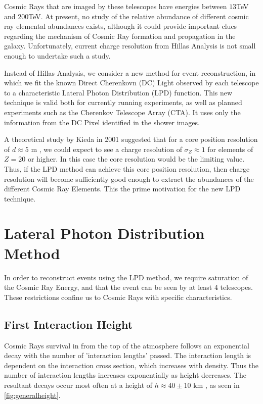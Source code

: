 \documentclass{article}
\begin{document}
Cosmic Rays that are imaged by these telescopes have energies between $13 $TeV and $200 $TeV. At present, no study of the relative abundance of different cosmic ray elemental abundances exists, although it could provide important clues regarding the mechanism of Cosmic Ray formation and propagation in the galaxy. Unfortunately, current charge resolution from Hillas Analysis is not small enough to undertake such a study.

Instead of Hillas Analysis, we consider a new method for event reconstruction, in which we fit the known Direct Cherenkovn (DC) Light observed by each telescope to a characteristic Lateral Photon Distribution (LPD) function. This new technique is valid both for currently running experiments, as well as planned experiments such as the Cherenkov Telescope Array (CTA). It uses only the information from the DC Pixel identified in the shower images.

A theoretical study by Kieda in 2001 \cite{kieda01} suggested that for a core position resolution of $d \approx 5 $ m , we could expect to see a charge resolution of $ \sigma_{Z} \approx 1 $ for elements of $Z = 20$ or higher. In this case the core resolution would be the limiting value. Thus, if the LPD method can achieve this core position resolution, then charge resolution will become sufficiently good enough to extract the abundances of the different Cosmic Ray Elements. This the prime motivation for the new LPD technique.

\section{Lateral Photon Distribution Method}
In order to reconstruct events using the LPD method, we require saturation of the Cosmic Ray Energy, and that the event can be seen by at least 4 telescopes. These restrictions confine us to Cosmic Rays with specific characteristics.

\subsection{First Interaction Height}
Cosmic Rays survival in from the top of the atmosphere follows an exponential decay with the number of 'interaction lengths' passed. The interaction length is dependent on the interaction cross section, which increases with density. Thus the number of interaction lengths increases exponentially as height decreases. The resultant decays occur most often at a height of $h \approx 40 \pm 10$ km , as seen in \ref{fig:generalheight}.
\end{document}

